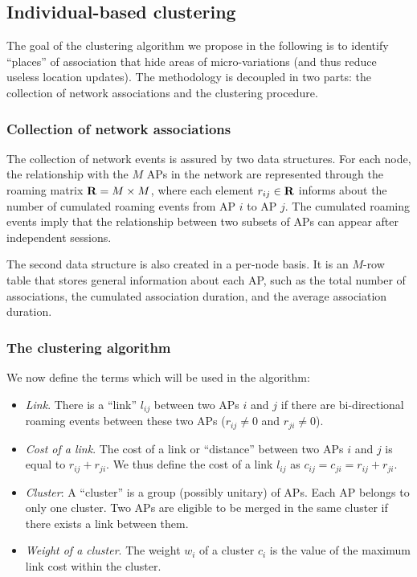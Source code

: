 \documentclass[a4paper]{sig-alternate-10pt}
\begin{document}
\subsection{Individual-based clustering}
\label{sec:clustering} \label{sec:algorithm}

The goal of the clustering algorithm we propose in the following is
to identify ``places'' of association that hide areas of
micro-variations (and thus reduce useless location updates). The
methodology is decoupled in two parts: the collection of network
associations and the clustering procedure.


\subsubsection{Collection of network associations}
\label{subsec:events}

The collection of network events is assured by two data structures.
For each node, the relationship with the $M$ APs in the
network are represented through the roaming matrix ${\bf R}=M\times
M$, where each element $r_{ij} \in {\bf R}$ informs about the number
of cumulated roaming events from AP $i$ to AP $j$. The cumulated
roaming events imply that the relationship between two subsets of
APs can appear after independent sessions.

The second data structure is also created in a per-node basis.
It is an $M$-row table that stores general information about each
AP, such as the total number of associations, the cumulated
association duration, and the average association duration.


\subsubsection{The clustering algorithm}
\label{subsec:algorithm}

We now define the terms which will be used in the algorithm:

\begin{itemize}

\item {\it Link}. There is a ``link'' $l_{ij}$ between two APs $i$
and $j$ if there are bi-directional roaming events between these two
APs ($r_{ij}\neq 0$ and $r_{ji}\neq 0$).

\item {\it Cost of a link}. The cost of a link or ``distance''
between two APs $i$ and $j$ is equal to $r_{ij}+r_{ji}$. We thus
define the cost of a link $l_{ij}$ as $c_{ij}=c_{ji}=r_{ij}+r_{ji}$.

\item {\it Cluster}: A ``cluster'' is a group (possibly unitary) of
APs. Each AP belongs to only one cluster. Two APs are eligible to be
merged in the same cluster if there exists a link between them.

\item {\it Weight of a cluster}. The weight $w_{i}$ of a cluster
$c_{i}$ is the value of the maximum link cost within the cluster.

\end{itemize}
\end{document}
